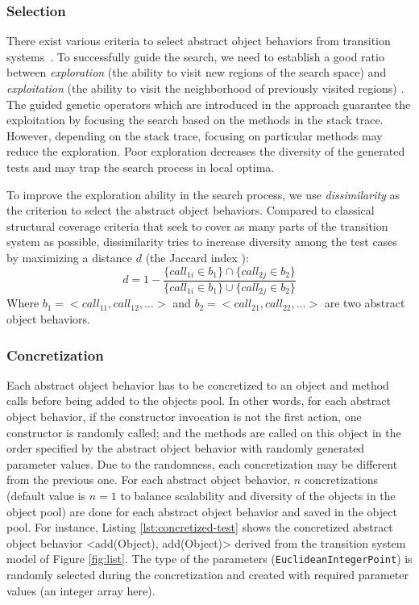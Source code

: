 \subsubsection{Selection}
\label{ssec:selection}

There exist various criteria to select abstract object behaviors from transition systems~\cite{Utting2007}.
%
To successfully guide the search, we need to establish a good ratio between \emph{exploration} (the ability to visit new regions of the search space) and \emph{exploitation} (the ability to visit the neighborhood of previously visited regions) \cite{vcrepinvsek2013}.
The guided genetic operators which are introduced in the \evocrash approach \cite{soltani2017} guarantee the exploitation by focusing the search based on the methods in the stack trace. However, depending on the stack trace, focusing on particular methods may reduce the exploration. Poor exploration decreases the diversity of the generated tests and may trap the search process in local optima.

To improve the exploration ability in the search process, we use \emph{dissimilarity} as the criterion to select the abstract object behaviors. Compared to classical structural coverage criteria that seek to cover as many parts of the transition system as possible, dissimilarity tries to increase diversity among the test cases by maximizing a distance $d$ (\ie the Jaccard index \cite{Jaccard1901}):
$$
d = 1 - \frac{ \{call_{1i} \in b_{1}\} \cap \{call_{2j} \in b_{2}\}}{\{call_{1i} \in b_{1}\} \cup \{call_{2j} \in b_{2}\}}
$$
Where $b_{1} = <\mathit{call}_{11}, \mathit{call}_{12}, \ldots> $ and $ b_{2} = <\mathit{call}_{21}, \mathit{call}_{22}, \ldots>$ are two abstract object behaviors.

\subsubsection{Concretization}
\label{ssec:concretization}

Each abstract object behavior has to be concretized to an object and method calls before being added to the objects pool. In other words, for each abstract object behavior, if the constructor invocation is not the first action, one constructor is randomly called; and the methods are called on this object in the order specified by the abstract object behavior with randomly generated parameter values. Due to the randomness, each concretization may be different from the previous one. For each abstract object behavior, $n$ concretizations (default value is $n=1$  to balance scalability and diversity of the objects in the object pool) are done for each abstract object behavior and saved in the object pool.
%
For instance, Listing \ref{lst:concretized-test} shows the concretized abstract object behavior {\ttfamily\footnotesize <add(Object), add(Object)>} derived from the transition system model of Figure \ref{fig:list}. The type of the parameters (\texttt{EuclideanIntegerPoint}) is randomly selected during the concretization and created with required parameter values (an integer array here).


